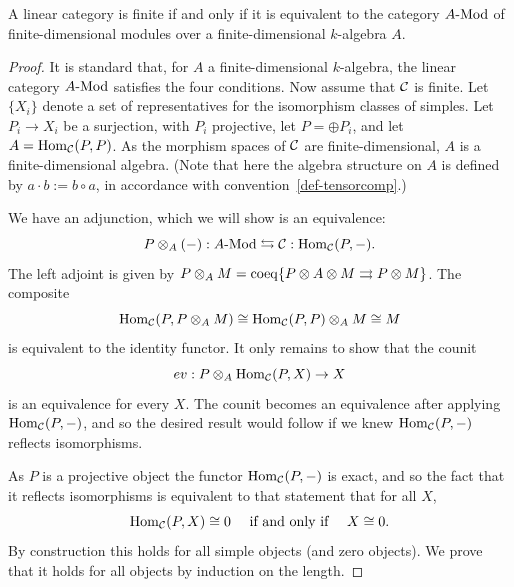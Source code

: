 \documentclass{amsart}
\begin{document}
\begin{proposition}
A linear category is finite if and only if it is equivalent to the category $\Mod{A}{}$ of finite-dimensional modules over a finite-dimensional $k$-algebra $A$.
\end{proposition}
\begin{proof}
	It is standard that, for $A$ a finite-dimensional $k$-algebra, the linear category $\Mod{A}{}$ satisfies the four conditions. %
	Now assume that $\mathcal C$ is finite. Let $\{X_i\}$ denote a set of representatives for the isomorphism classes of simples. Let $P_i \to X_i$ be a surjection, with $P_i$ projective, let $P = \oplus P_i$, and let $A = \operatorname{Hom}_{\mathcal C}(P,P)$. As the morphism spaces of $\mathcal C$ are finite-dimensional, $A$ is a finite-dimensional algebra.  (Note that here the algebra structure on $A$ is defined by $a \cdot b := b \circ a$, in accordance with convention~\ref{def-tensorcomp}.)
	
We have an adjunction, which we will show is an equivalence:
	\begin{equation*}
		P \otimes_A (-):\Mod{A}{} \leftrightarrows \cC: \Hom_{\cC}(P,-).
	\end{equation*}
	The left adjoint is given by $P \otimes_A M = \operatorname{coeq}\{ P \otimes A \otimes M \rightrightarrows P \otimes M\}$. 
The composite 
\begin{equation*}
	\operatorname{Hom}_{\mathcal C}(P, P \otimes_A M) \cong \operatorname{Hom}_{\mathcal C}(P, P) \otimes_A M \cong M
\end{equation*}
 is equivalent to the identity functor. It only remains to show that the counit 
\begin{equation*}
	ev:P \otimes_A \operatorname{Hom}_{\mathcal C}(P, X) \to X
\end{equation*}
is an equivalence for every $X$. The counit becomes an equivalence after applying $\operatorname{Hom}_{\mathcal C}(P,-)$, and so the desired result would follow if we knew $\operatorname{Hom}_{\mathcal C}(P,-)$ reflects isomorphisms. 

As $P$ is a projective object the functor $\operatorname{Hom}_{\mathcal C}(P,-)$ is exact, and so the fact that it reflects isomorphisms is equivalent to that statement that for all $X$, 
\begin{equation*}
	\operatorname{Hom}_{\mathcal C}(P,X) \cong 0 \quad \textrm{ if and only if } \quad X \cong 0.
\end{equation*} 
By construction this holds for all simple objects (and zero objects). We prove that it holds for all objects by induction on the length. 


\end{proof}
\end{document}
